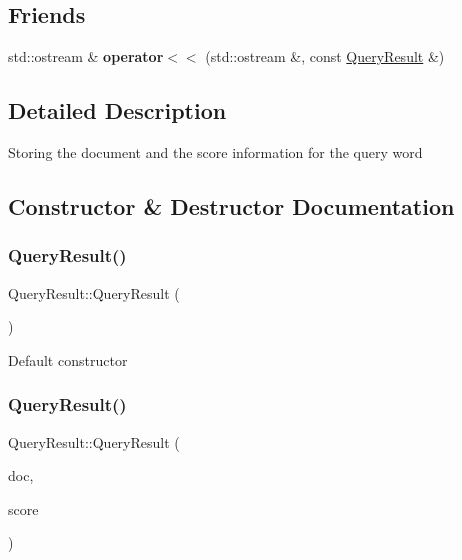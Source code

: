 \subsection*{Friends}
\begin{DoxyCompactItemize}
\item 
\mbox{\label{classQueryResult_a508480dcd37309a0df1c62221b6a15e3}} 
std\+::ostream \& {\bfseries operator$<$$<$} (std\+::ostream \&, const \hyperlink{classQueryResult}{Query\+Result} \&)
\end{DoxyCompactItemize}


\subsection{Detailed Description}
Storing the document and the score information for the query word 

\subsection{Constructor \& Destructor Documentation}
\mbox{\label{classQueryResult_a23c0f8433d60025e81759f569dc08ab8}} 
\subsubsection{\texorpdfstring{Query\+Result()}{QueryResult()}\hspace{0.1cm}{\footnotesize\ttfamily [1/2]}}
{\footnotesize\ttfamily Query\+Result\+::\+Query\+Result (\begin{DoxyParamCaption}{ }\end{DoxyParamCaption})}

Default constructor \mbox{\label{classQueryResult_ae765defee1fe2d3a1361f00d24de6f8b}} 
\subsubsection{\texorpdfstring{Query\+Result()}{QueryResult()}\hspace{0.1cm}{\footnotesize\ttfamily [2/2]}}
{\footnotesize\ttfamily Query\+Result\+::\+Query\+Result (\begin{DoxyParamCaption}\item[{const \hyperlink{classIndexItem}{Index\+Item}}]{doc,  }\item[{const double}]{score }\end{DoxyParamCaption})}

